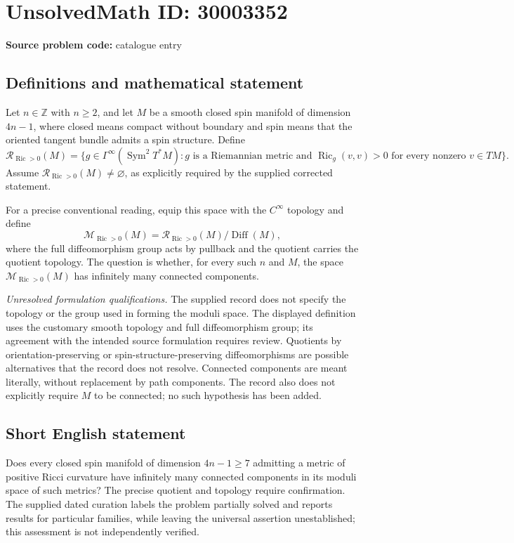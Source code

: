 \documentclass[11pt]{article}
\newcommand{\Z}{\mathbb{Z}}
\begin{document}
\section*{UnsolvedMath ID: 30003352}
\textbf{Source problem code:} catalogue entry
\subsection{Definitions and mathematical statement}
Let \(n\in\Z\) with \(n\geq 2\), and let \(M\) be a smooth closed spin manifold of dimension \(4n-1\), where closed means compact without boundary and spin means that the oriented tangent bundle admits a spin structure. Define
\[
\mathcal R_{\operatorname{Ric}>0}(M)=\{g\in\Gamma^\infty(\operatorname{Sym}^2T^*M): g\text{ is a Riemannian metric and }\operatorname{Ric}_g(v,v)>0\text{ for every nonzero }v\in TM\}.
\]
Assume \(\mathcal R_{\operatorname{Ric}>0}(M)\neq\varnothing\), as explicitly required by the supplied corrected statement.

For a precise conventional reading, equip this space with the \(C^\infty\) topology and define
\[
\mathcal M_{\operatorname{Ric}>0}(M)=\mathcal R_{\operatorname{Ric}>0}(M)/\operatorname{Diff}(M),
\]
where the full diffeomorphism group acts by pullback and the quotient carries the quotient topology. The question is whether, for every such \(n\) and \(M\), the space \(\mathcal M_{\operatorname{Ric}>0}(M)\) has infinitely many connected components.

\emph{Unresolved formulation qualifications.} The supplied record does not specify the topology or the group used in forming the moduli space. The displayed definition uses the customary smooth topology and full diffeomorphism group; its agreement with the intended source formulation requires review. Quotients by orientation-preserving or spin-structure-preserving diffeomorphisms are possible alternatives that the record does not resolve. Connected components are meant literally, without replacement by path components. The record also does not explicitly require \(M\) to be connected; no such hypothesis has been added.
\subsection{Short English statement}
Does every closed spin manifold of dimension \(4n-1\geq 7\) admitting a metric of positive Ricci curvature have infinitely many connected components in its moduli space of such metrics? The precise quotient and topology require confirmation. The supplied dated curation labels the problem partially solved and reports results for particular families, while leaving the universal assertion unestablished; this assessment is not independently verified.
\end{document}
